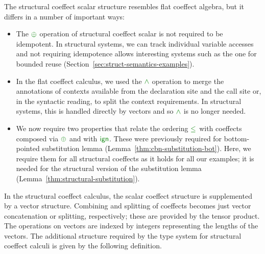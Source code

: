 \noindent
The structural coeffect scalar structure resembles flat coeffect algebra, but it differs in a
number of important ways:
%
\begin{itemize}
\item The $\cpar$ operation of structural coeffect scalar is not required to be idempotent. In structural
  systems, we can track individual variable accesses and not requiring idempotence allows interesting
  systems such as the one for bounded reuse (Section~\ref{sec:struct-semantics-examples}).

\item In the flat coeffect calculus, we used the $\czip$ operation to merge the annotations of contexts
  available from the declaration site and the call site or, in the syntactic reading, to split the
  context requirements. In structural systems, this is handled directly by vectors and so $\czip$
  is no longer needed.

\item We now require two properties that relate the ordering $\cleq$ with coeffects composed
  via $\cpar$ and with $\czero$. These were previously required for bottom-pointed substitution lemma
  (Lemma~\ref{thm:cbn-substitution-bot}). Here, we require them for all structural coeffects as it holds
  for all our examples; it is needed for the structural version of the substitution lemma
  (Lemma~\ref{thm:structural-substitution}).
\end{itemize}

\noindent
In the structural coeffect calculus, the scalar coeffect structure is supplemented by a vector
structure. Combining and splitting of coeffects becomes just vector concatenation or splitting,
respectively; these are provided by the tensor product. The operations on vectors are indexed by
integers representing the lengths of the vectors. The additional structure required by the type
system for structural coeffect calculi is given by the following definition.

